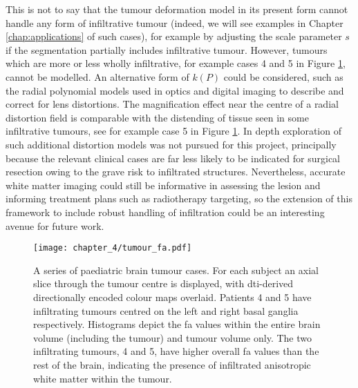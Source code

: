 This is not to say that the tumour deformation model in its present form cannot handle any form of infiltrative tumour (indeed, we will see examples in Chapter \ref{chap:applications} of such cases), for example by adjusting the scale parameter $s$ if the segmentation partially includes infiltrative tumour.
However, tumours which are more or less wholly infiltrative, for example cases 4 and 5 in Figure \ref{fig:fa_hist}, cannot be modelled.
An alternative form of $k(P)$ could be considered, such as the radial polynomial models used in optics and digital imaging to describe and correct for lens distortions.\autocite{Zhang2000a}
The magnification effect near the centre of a radial distortion field is comparable with the distending of tissue seen in some infiltrative tumours, see for example case 5 in Figure \ref{fig:fa_hist}.
In depth exploration of such additional distortion models was not pursued for this project, principally because the relevant clinical cases are far less likely to be indicated for surgical resection owing to the grave risk to infiltrated structures.
Nevertheless, accurate white matter imaging could still be informative in assessing the lesion and informing treatment plans such as radiotherapy targeting,\autocite{Jena2005,Berberat2014} so the extension of this framework to include robust handling of infiltration could be an interesting avenue for future work.

\begin{figure}[htb!]
  \texttt{[image: chapter\_4/tumour\_fa.pdf]}
  \caption{A series of paediatric brain tumour cases. For each subject an axial slice through the tumour centre is displayed, with \gls{dti}-derived directionally encoded colour maps overlaid. Patients 4 and 5 have infiltrating tumours centred on the left and right basal ganglia respectively. Histograms depict the \gls{fa} values within the entire brain volume (including the tumour) and tumour volume only. The two infiltrating tumours, 4 and 5, have higher overall \gls{fa} values than the rest of the brain, indicating the presence of infiltrated anisotropic white matter within the tumour.}
  \label{fig:fa_hist}
\end{figure}

